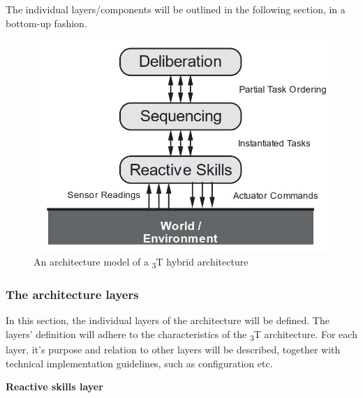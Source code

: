 \documentclass[main.tex]{subfiles}
\begin{document}
The individual layers/components will be outlined in the following section, in a bottom-up
fashion.

\begin{figure}[htbp]
    \centering
    \includegraphics[width=.8\textwidth]{3t-arch.jpg}
    \caption{An architecture model of a \textsubscript{3}T hybrid architecture \cite{Bonasso1995}}
    \label{3-arch2}
\end{figure}



\subsubsection{The architecture layers}

In this section, the individual layers of the architecture will be defined. The layers' definition will 
adhere to the characteristics of the \textsubscript{3}T architecture. For each layer, it's purpose and 
relation to other layers will be described, together with technical implementation guidelines, such as 
configuration etc.

\textbf{Reactive skills layer}
\end{document}
